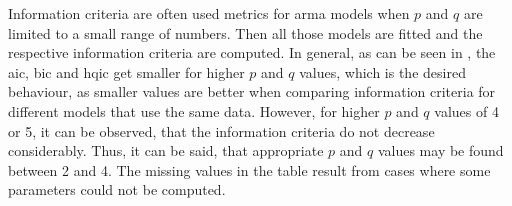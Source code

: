 Information criteria are often used metrics for \gls{arma} models when $p$ and $q$ are limited to a small range of numbers. Then all those models are fitted and the respective information criteria are computed. In general, as can be seen in , the \gls{aic}, \gls{bic} and \gls{hqic} get smaller for higher $p$ and $q$ values, which is the desired behaviour, as smaller values are better when comparing information criteria for different models that use the same data. However, for higher $p$ and $q$ values of 4 or 5, it can be observed, that the information criteria do not decrease considerably. Thus, it can be said, that appropriate $p$ and $q$ values may be found between 2 and 4. The missing values in the table result from cases where some parameters could not be computed.\\

